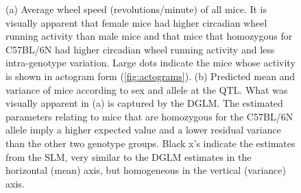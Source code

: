 \begin{figure}
      \caption[
        (a) Average wheel speed (revolutions/minute) of all mice.
        (b) Predicted mean and variance of mice according to sex and allele at the QTL.
      ]
      {
          (a) Average wheel speed (revolutions/minute) of all mice.
          It is visually apparent that female mice had higher circadian wheel running activity than male mice and that mice that homozygous for C57BL/6N had higher circadian wheel running activity and less intra-genotype variation. 
          Large dots indicate the mice whose activity is shown in actogram form (\autoref{fig:actograms}).
          (b) Predicted mean and variance of mice according to sex and allele at the QTL.  What was visually apparent in (a) is captured by the DGLM.  The estimated parameters relating to mice that are homozygous for the C57BL/6N allele imply a higher expected value and a lower residual variance than the other two genotype groups. Black x's indicate the estimates from the SLM, very similar to the DGLM estimates in the horizontal (mean) axis, but homogeneous in the vertical (variance) axis.
      }
      \label{fig:kumar_detail}
    \end{figure}



